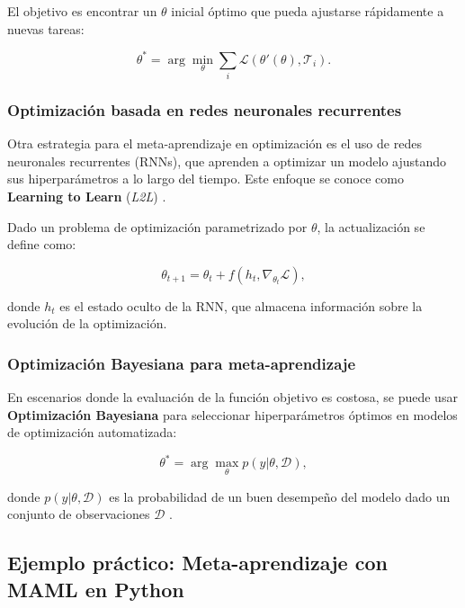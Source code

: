 \begin{itemize}
		El objetivo es encontrar un \( \theta \) inicial óptimo que pueda ajustarse rápidamente a nuevas tareas:
		
		\begin{equation}
			\theta^* = \arg \min_{\theta} \sum_{i} \mathcal{L}(\theta'(\theta), \mathcal{T}_i).
		\end{equation}
		
		\subsubsection{Optimización basada en redes neuronales recurrentes}
		
		Otra estrategia para el meta-aprendizaje en optimización es el uso de redes neuronales recurrentes (RNNs), que aprenden a optimizar un modelo ajustando sus hiperparámetros a lo largo del tiempo. Este enfoque se conoce como \textbf{Learning to Learn} (\textit{L2L}) \cite{andrychowicz2016learning}.
		
		Dado un problema de optimización parametrizado por \( \theta \), la actualización se define como:
		
		\begin{equation}
			\theta_{t+1} = \theta_t + f(h_t, \nabla_{\theta_t} \mathcal{L}),
		\end{equation}
		
		donde \( h_t \) es el estado oculto de la RNN, que almacena información sobre la evolución de la optimización.
		
		\subsubsection{Optimización Bayesiana para meta-aprendizaje}
		
		En escenarios donde la evaluación de la función objetivo es costosa, se puede usar \textbf{Optimización Bayesiana} para seleccionar hiperparámetros óptimos en modelos de optimización automatizada:
		
		\begin{equation}
			\theta^* = \arg \max_{\theta} p(y | \theta, \mathcal{D}),
		\end{equation}
		
		donde \( p(y | \theta, \mathcal{D}) \) es la probabilidad de un buen desempeño del modelo dado un conjunto de observaciones \( \mathcal{D} \) \cite{frazier2018tutorial}.
		
		\subsection{Ejemplo práctico: Meta-aprendizaje con MAML en Python}
		

\end{itemize}
